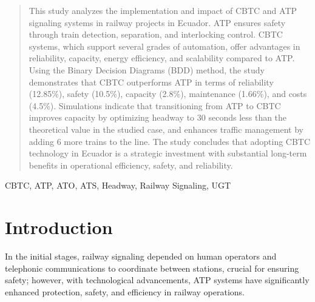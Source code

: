 \documentclass[conference]{IEEEtran}
\begin{document}
\maketitle
\begin{abstract}
This study analyzes the implementation and impact of CBTC and ATP signaling systems in railway projects in Ecuador. ATP ensures safety through train detection, separation, and interlocking control. CBTC systems, which support several grades of automation, offer advantages in reliability, capacity, energy efficiency, and scalability compared to ATP. Using the Binary Decision Diagrams (BDD) method, the study demonstrates that CBTC outperforms ATP in terms of reliability (12.85\%), safety (10.5\%), capacity (2.8\%), maintenance (1.66\%), and costs (4.5\%). Simulations indicate that transitioning from ATP to CBTC improves capacity by optimizing headway to 30 seconds less than the theoretical value in the studied case, and enhances traffic management by adding 6 more trains to the line. The study concludes that adopting CBTC technology in Ecuador is a strategic investment with substantial long-term benefits in operational efficiency, safety, and reliability.
\end{abstract}

\begin{IEEEkeywords}
CBTC, ATP, ATO, ATS, Headway, Railway Signaling, UGT
\end{IEEEkeywords}


\section{Introduction}
In the initial stages, railway signaling depended on human operators and telephonic communications to coordinate between stations, crucial for ensuring safety; however, with technological advancements, ATP systems have significantly enhanced protection, safety, and efficiency in railway operations.
\end{document}

